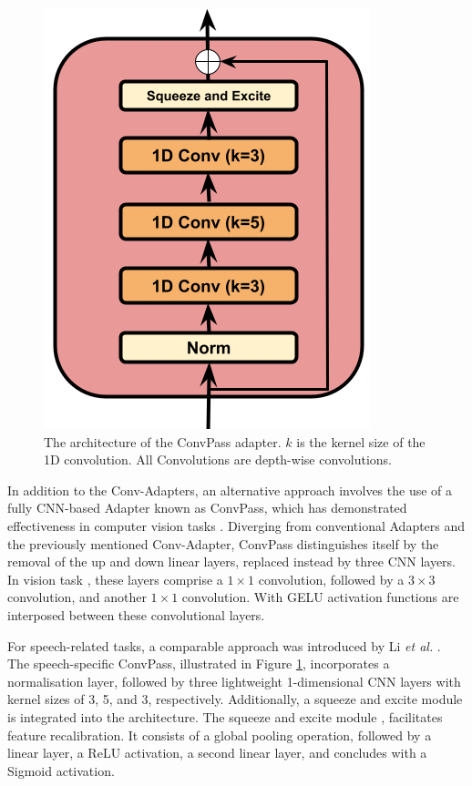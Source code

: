 \begin{figure}
    \begin{center}
        \includegraphics[scale=0.4]{imgs/ConvPass.png}
        \caption{The architecture of the ConvPass adapter. $k$ is the kernel size of the 1D convolution. All Convolutions are depth-wise convolutions.}
        \label{fig:convpass}
    \end{center}
\end{figure}

In addition to the Conv-Adapters, an alternative approach involves the use of a fully \ac{CNN}-based Adapter known as ConvPass, which has demonstrated effectiveness in computer vision tasks \cite{jie2022convolutional}. Diverging from conventional Adapters and the previously mentioned Conv-Adapter, ConvPass distinguishes itself by the removal of the up and down linear layers, replaced instead by three \ac{CNN} layers. In vision task \cite{jie2022convolutional}, these layers comprise a $1 \times 1$ convolution, followed by a $3 \times 3$ convolution, and another $1 \times 1$ convolution. With \ac{GELU} activation functions are interposed between these convolutional layers.

For speech-related tasks, a comparable approach was introduced by Li \textit{et al.} \cite{li2023evaluating}. The speech-specific ConvPass, illustrated in Figure \ref{fig:convpass}, incorporates a normalisation layer, followed by three lightweight 1-dimensional \ac{CNN} layers with kernel sizes of 3, 5, and 3, respectively. Additionally, a squeeze and excite module is integrated into the architecture. The squeeze and excite module \cite{hu2018squeeze}, facilitates feature recalibration. It consists of a global pooling operation, followed by a linear layer, a \ac{ReLU} activation, a second linear layer, and concludes with a Sigmoid activation.

